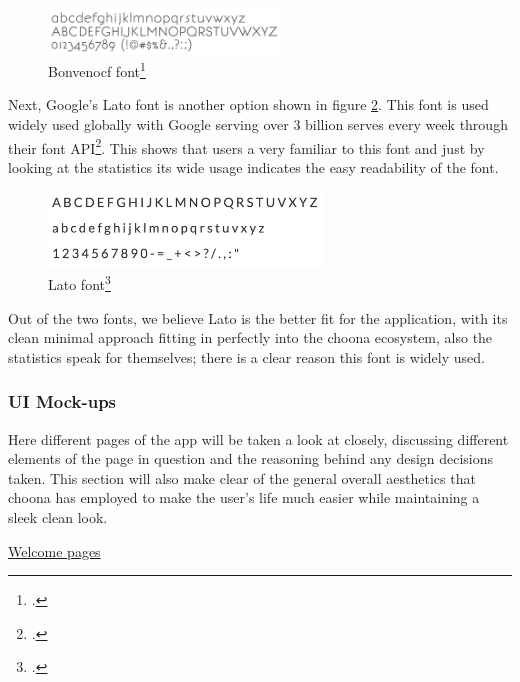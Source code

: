 \begin{figure}[h!]
\centering
\includegraphics[width=0.55\textwidth]{./img/bonvenocf.png}
\caption{Bonvenocf font\footcite{bonvenocf}}
\label{fig:Bonvenocf}
\end{figure}

Next, Google's Lato font is another option shown in figure \ref{fig:lato}. This font is used widely used globally with Google serving over 3 billion serves every week through their font API\footcite{googlelato}. This shows that users a very familiar to this font and just by looking at the statistics its wide usage indicates the easy readability of the font.

\begin{figure}[h!]
\centering
\includegraphics[width=0.65\textwidth]{./img/lato.png}
\caption{Lato font\footcite{googlelato}}
\label{fig:lato}
\end{figure}

Out of the two fonts, we believe Lato is the better fit for the application, with its clean minimal approach fitting in perfectly into the choona ecosystem, also the statistics speak for themselves; there is a clear reason this font is widely used.\\

\subsubsection*{UI Mock-ups}

Here different pages of the app will be taken a look at closely, discussing different elements of the page in question and the reasoning behind any design decisions taken. This section will also make clear of the general overall aesthetics that choona has employed to make the user's life much easier while maintaining a sleek clean look.\\

\clearpage

\noindent\underline{Welcome pages}\newline

